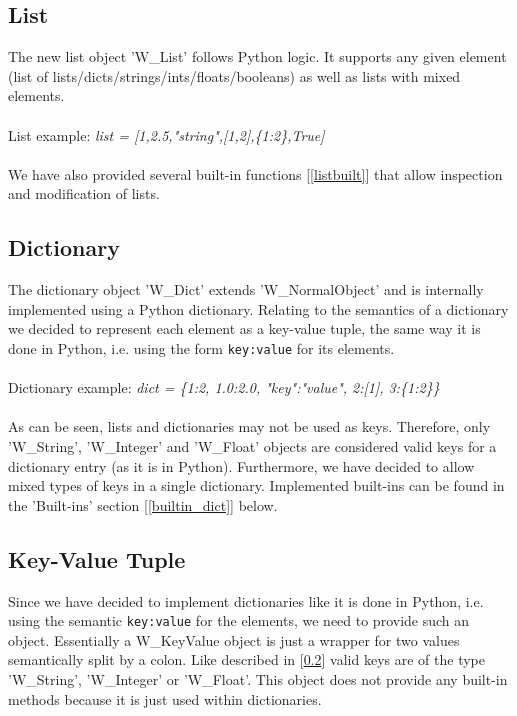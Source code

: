 \documentclass{article}
\begin{document}
\subsection{List}
The new list object 'W\_List' follows Python logic. It supports any given element (list of lists/dicts/strings/ints/floats/booleans) as well as lists with mixed elements.\\
\\ List example: \textit{list = [1,2.5,"string",[1,2],\{1:2\},True]} \\\\
We have also provided several built-in functions [\ref{listbuilt}] that allow inspection and modification of lists.

\subsection{Dictionary}
\label{dicts}
The dictionary object 'W\_Dict' extends 'W\_NormalObject' and is internally implemented using a Python dictionary.
Relating to the semantics of a dictionary we decided to represent each element as a key-value tuple, the same way it is done in Python, i.e. using the form \texttt{key:value} for its elements. \\\\ Dictionary example: \textit{dict = \{1:2, 1.0:2.0, "key":"value", 2:[1], 3:\{1:2\}\}} \\\\
As can be seen, lists and dictionaries may not be used as keys. Therefore, only 'W\_String', 'W\_Integer' and 'W\_Float' objects are considered valid keys for a dictionary entry (as it is in Python). Furthermore, we have decided to allow mixed types of keys in a single dictionary. Implemented built-ins can be found in the 'Built-ins' section [\ref{builtin_dict}] below.

\subsection{Key-Value Tuple}
Since we have decided to implement dictionaries like it is done in Python, i.e. using the semantic \texttt{key:value} for the elements, we need to provide such an object.
Essentially a W\_KeyValue object is just a wrapper for two values semantically split by a colon.
Like described in [\ref{dicts}] valid keys are of the type 'W\_String', 'W\_Integer' or 'W\_Float'. This object does not provide any built-in methods because it is just used within dictionaries.
\end{document}
